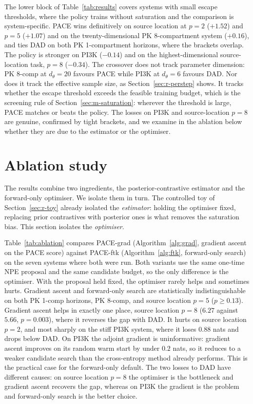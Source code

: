 The lower block of Table~\ref{tab:results} covers systems with small escape
thresholds, where the policy trains without saturation and the comparison is
system-specific. PACE wins definitively on source location at $p{=}2$ ($+1.52$) and
$p{=}5$ ($+1.07$) and on the twenty-dimensional PK 8-compartment system ($+0.16$), and
ties DAD on both PK 1-compartment horizons, where the brackets overlap. The policy is
stronger on PI3K ($-0.14$) and on the highest-dimensional source-location task,
$p{=}8$ ($-0.34$). The crossover does not track parameter dimension: PK 8-comp at
$d_\theta=20$ favours PACE while PI3K at $d_\theta=6$ favours DAD. Nor does it track the
effective sample size, as Section~\ref{sec:r-perstep} shows. It tracks whether the
escape threshold exceeds the feasible training budget, which is the screening rule of
Section~\ref{sec:m-saturation}: wherever the threshold is large, PACE matches or beats
the policy. The losses on PI3K and source-location $p{=}8$ are genuine, confirmed by
tight brackets, and we examine in the ablation below whether they are due to the
estimator or the optimiser.

\section{Ablation study}
\label{sec:r-ablation}

The results combine two ingredients, the posterior-contrastive estimator and the
forward-only optimiser. We isolate them in turn. The controlled toy of
Section~\ref{sec:r-toy} already isolated the \emph{estimator}: holding the optimiser
fixed, replacing prior contrastives with posterior ones is what removes the saturation
bias. This section isolates the \emph{optimiser}.

Table~\ref{tab:ablation} compares PACE-grad (Algorithm~\ref{alg:grad}, gradient ascent
on the PACE score) against PACE-ftk (Algorithm~\ref{alg:ftk}, forward-only search) on
the seven systems where both were run. Both variants use the same one-time NPE proposal
and the same candidate budget, so the only difference is the optimiser. With the
proposal held fixed, the optimiser rarely helps and sometimes hurts. Gradient ascent
and forward-only search are statistically indistinguishable on both PK 1-comp horizons,
PK 8-comp, and source location $p{=}5$ ($p\ge0.13$). Gradient ascent helps in exactly
one place, source location $p{=}8$ ($6.27$ against $5.66$, $p=0.003$), where it
reverses the gap with DAD. It hurts on source location $p{=}2$, and most sharply on the
stiff PI3K system, where it loses $0.88$ nats and drops below DAD. On PI3K the adjoint
gradient is uninformative: gradient ascent improves on its random warm start by under
$0.2$ nats, so it reduces to a weaker candidate search than the cross-entropy method
already performs. This is the practical case for the forward-only default. The two
losses to DAD have different causes: on source location $p{=}8$ the optimiser is the
bottleneck and gradient ascent recovers the gap, whereas on PI3K the gradient is the
problem and forward-only search is the better choice.

